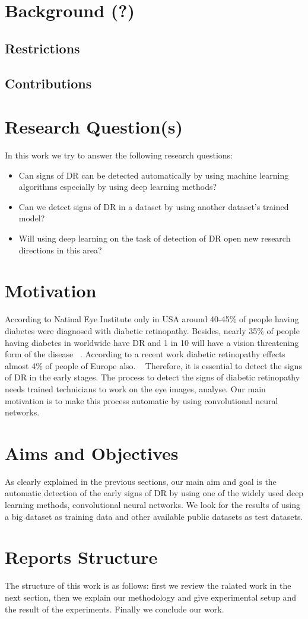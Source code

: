 \section{Background (?)} 

\subsection{Restrictions}
\subsection{Contributions}



\section{Research Question(s)}
In this work we try to answer the following research questions:

\begin{itemize}
    \item Can signs of DR can be detected automatically by using machine learning algorithms especially by using deep learning methods?
    \item Can we detect signs of DR in a dataset by using another dataset's trained model?
    \item Will using deep learning on the task of detection of DR open new research directions in this area? 
\end{itemize}
\section{Motivation}
According to Natinal Eye Institute only in USA around 40-45\% of people having diabetes were diagnosed with diabetic retinopathy. Besides, nearly 35\% of people having diabetes in worldwide have DR and 1 in 10 will have a vision threatening form of the disease ~\cite{yau2012global}. According to a recent work diabetic retinopathy effects almost 4\% of people of Europe also. ~\cite{nentwich2015diabetic} Therefore, it is essential to detect the signs of DR in the early stages. The process to detect the signs of diabetic retinopathy needs trained technicians to work on the eye images, analyse. Our main motivation is to make this process automatic by using convolutional neural networks.
\section{Aims and Objectives}
As clearly explained in the previous sections, our main aim and goal is the automatic detection of the early signs of DR by using one of the widely used deep learning methods, convolutional neural networks. We look for the results of using a big dataset as training data and other available public datasets as test datasets. 
\section{Reports Structure}
The structure of this work is as follows: first we review the ralated work in the next section, then we explain our methodology and give experimental setup and the result of the experiments. Finally we conclude our work. 